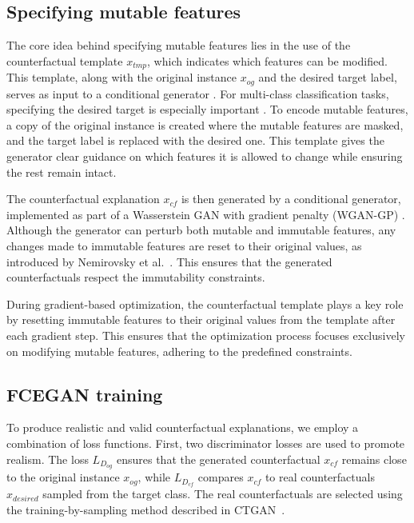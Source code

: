 \documentclass[runningheads]{llncs}
\begin{document}
\subsection{Specifying mutable features}
The core idea behind specifying mutable features lies in the use of the counterfactual template \( x_{tmp} \), which indicates which features can be modified. This template, along with the original instance \( x_{og} \) and the desired target label, serves as input to a conditional generator \cite{mirza_conditional_2014}. For multi-class classification tasks, specifying the desired target is especially important \cite{grandini2020metrics}. To encode mutable features, a copy of the original instance is created where the mutable features are masked, and the target label is replaced with the desired one. This template gives the generator clear guidance on which features it is allowed to change while ensuring the rest remain intact.

The counterfactual explanation \( x_{cf} \) is then generated by a conditional generator, implemented as part of a Wasserstein GAN \cite{arjovsky_towards_2017,arjovsky_wasserstein_2017} with gradient penalty (WGAN-GP) \cite{gulrajani_improvedwgan_2017}. Although the generator can perturb both mutable and immutable features, any changes made to immutable features are reset to their original values, as introduced by Nemirovsky et al.~\cite{nemirovsky_2022_countergan}. This ensures that the generated counterfactuals respect the immutability constraints.

During gradient-based optimization, the counterfactual template plays a key role by resetting immutable features to their original values from the template after each gradient step. This ensures that the optimization process focuses exclusively on modifying mutable features, adhering to the predefined constraints.

\subsection{FCEGAN training}
\label{subsec:fcegan-training}
To produce realistic and valid counterfactual explanations, we employ a combination of loss functions. First, two discriminator losses are used to promote realism. The loss \( L_{D_{og}} \) ensures that the generated counterfactual \( x_{cf} \) remains close to the original instance \( x_{og} \), while \( L_{D_{cf}} \) compares \( x_{cf} \) to real counterfactuals \( x_{desired} \) sampled from the target class. The real counterfactuals are selected using the training-by-sampling method described in CTGAN~\cite{xu_modeling_2019}.
\end{document}
